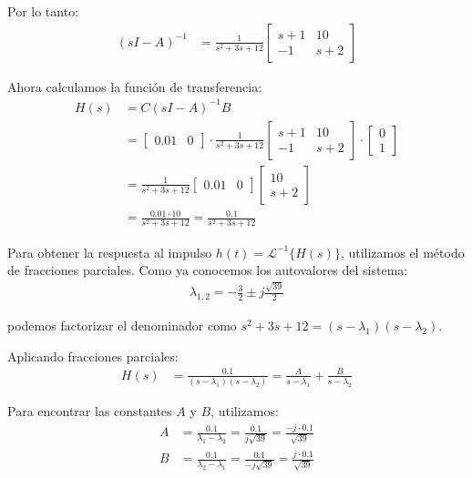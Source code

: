 \documentclass[
  11pt,
  letterpaper,
   addpoints,
  answers
  ]{exam}
\begin{document}
\begin{solution}
Por lo tanto:
\begin{align}
(sI-A)^{-1} &= \frac{1}{s^2+3s+12} \begin{bmatrix}s+1&10\\ -1&s+2\end{bmatrix}
\end{align}

Ahora calculamos la función de transferencia:
\begin{align}
H(s) &= C(sI-A)^{-1}B \\
&= \begin{bmatrix}0.01&0\end{bmatrix} \cdot \frac{1}{s^2+3s+12} \begin{bmatrix}s+1&10\\ -1&s+2\end{bmatrix} \cdot \begin{bmatrix}0\\1\end{bmatrix} \\
&= \frac{1}{s^2+3s+12} \begin{bmatrix}0.01&0\end{bmatrix} \begin{bmatrix}10\\ s+2\end{bmatrix} \\
&= \frac{0.01 \cdot 10}{s^2+3s+12} = \frac{0.1}{s^2+3s+12}
\end{align}

Para obtener la respuesta al impulso $h(t) = \mathcal{L}^{-1}\{H(s)\}$, utilizamos el método de fracciones parciales. Como ya conocemos los autovalores del sistema:
\begin{align}
\lambda_{1,2} = -\frac{3}{2} \pm j\frac{\sqrt{39}}{2}
\end{align}

podemos factorizar el denominador como $s^2+3s+12=(s-\lambda_1)(s-\lambda_2)$. 

Aplicando fracciones parciales:
\begin{align}
H(s) &= \frac{0.1}{(s-\lambda_1)(s-\lambda_2)} = \frac{A}{s-\lambda_1} + \frac{B}{s-\lambda_2}
\end{align}

Para encontrar las constantes $A$ y $B$, utilizamos:
\begin{align}
A &= \frac{0.1}{\lambda_1-\lambda_2} = \frac{0.1}{j\sqrt{39}} = \frac{-j \cdot 0.1}{\sqrt{39}} \\
B &= \frac{0.1}{\lambda_2-\lambda_1} = \frac{0.1}{-j\sqrt{39}} = \frac{j \cdot 0.1}{\sqrt{39}}
\end{align}


\end{solution}
\end{document}
